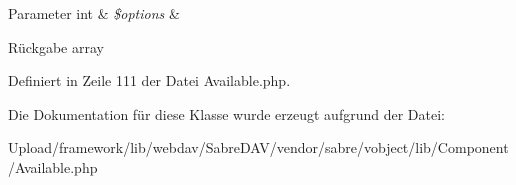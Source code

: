 \begin{DoxyParams}[1]{Parameter}
int & {\em \$options} & \\
\hline
\end{DoxyParams}
\begin{DoxyReturn}{Rückgabe}
array 
\end{DoxyReturn}


Definiert in Zeile 111 der Datei Available.\+php.



Die Dokumentation für diese Klasse wurde erzeugt aufgrund der Datei\+:\begin{DoxyCompactItemize}
\item 
Upload/framework/lib/webdav/\+Sabre\+D\+A\+V/vendor/sabre/vobject/lib/\+Component/Available.\+php\end{DoxyCompactItemize}
